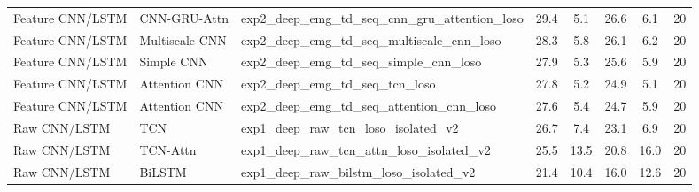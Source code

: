 \begin{table}[htbp]
{\begin{tabular}{lllccccc}
Feature CNN/LSTM & CNN-GRU-Attn & exp2_deep_emg_td_seq_cnn_gru_attention_loso & 29.4 & 5.1 & 26.6 & 6.1 & 20 \\
Feature CNN/LSTM & Multiscale CNN & exp2_deep_emg_td_seq_multiscale_cnn_loso & 28.3 & 5.8 & 26.1 & 6.2 & 20 \\
Feature CNN/LSTM & Simple CNN & exp2_deep_emg_td_seq_simple_cnn_loso & 27.9 & 5.3 & 25.6 & 5.9 & 20 \\
Feature CNN/LSTM & Attention CNN & exp2_deep_emg_td_seq_tcn_loso & 27.8 & 5.2 & 24.9 & 5.1 & 20 \\
Feature CNN/LSTM & Attention CNN & exp2_deep_emg_td_seq_attention_cnn_loso & 27.6 & 5.4 & 24.7 & 5.9 & 20 \\
Raw CNN/LSTM & TCN & exp1_deep_raw_tcn_loso_isolated_v2 & 26.7 & 7.4 & 23.1 & 6.9 & 20 \\
Raw CNN/LSTM & TCN-Attn & exp1_deep_raw_tcn_attn_loso_isolated_v2 & 25.5 & 13.5 & 20.8 & 16.0 & 20 \\
Raw CNN/LSTM & BiLSTM & exp1_deep_raw_bilstm_loso_isolated_v2 & 21.4 & 10.4 & 16.0 & 12.6 & 20 \\
\bottomrule
\end{tabular}%
}
\end{table}

